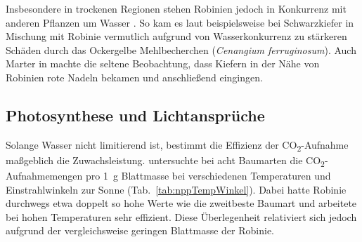 \documentclass[twocolumn]{scrartcl}
\begin{document}
Insbesondere in trockenen Regionen stehen Robinien jedoch in Konkurrenz mit anderen Pflanzen um Wasser \citep{halasz2021robinieAlsTierutter}. So kam es laut \citet[S.~96]{donaubauer1974kiefernsterben} beispielsweise bei Schwarzkiefer in Mischung mit Robinie vermutlich aufgrund von Wasserkonkurrenz zu stärkeren Schäden durch das Ockergelbe Mehlbecherchen (\emph{Cenangium ferruginosum}).
Auch Marter in \citet[S.~93]{erteld1952robinieErtrag} machte die seltene Beobachtung, dass Kiefern in der Nähe von Robinien rote Nadeln bekamen und anschließend eingingen.

\subsection{Photosynthese und Lichtansprüche}

Solange Wasser nicht limitierend ist, bestimmt die Effizienz der CO\textsubscript{2}-Aufnahme maßgeblich die Zuwachsleistung. \citet{lubimenko1906npp} untersuchte bei acht Baumarten die CO\textsubscript{2}-Aufnahmemengen pro \SI{1}{\gram} Blattmasse bei verschiedenen Temperaturen und Einstrahlwinkeln zur Sonne (Tab.~\ref{tab:nppTempWinkel}). Dabei hatte Robinie durchwegs etwa doppelt so hohe Werte wie die zweitbeste Baumart und arbeitete bei hohen Temperaturen sehr effizient. Diese Überlegenheit relativiert sich jedoch aufgrund der vergleichsweise geringen Blattmasse der Robinie.
\end{document}
